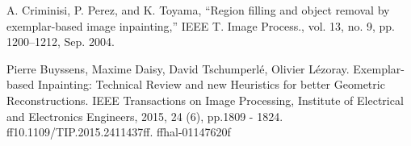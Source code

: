 \documentclass[conference]{IEEEtran}
\begin{document}
\begin{thebibliography}{00}
 A. Criminisi, P. Perez, and K. Toyama, “Region filling and object
removal by exemplar-based image inpainting,” IEEE T. Image Process.,
vol. 13, no. 9, pp. 1200–1212, Sep. 2004.

 Pierre Buyssens, Maxime Daisy, David Tschumperlé, Olivier Lézoray. Exemplar-based Inpainting:
Technical Review and new Heuristics for better Geometric Reconstructions. IEEE Transactions on
Image Processing, Institute of Electrical and Electronics Engineers, 2015, 24 (6), pp.1809 - 1824.
ff10.1109/TIP.2015.2411437ff. ffhal-01147620f
\end{thebibliography}
\end{document}
